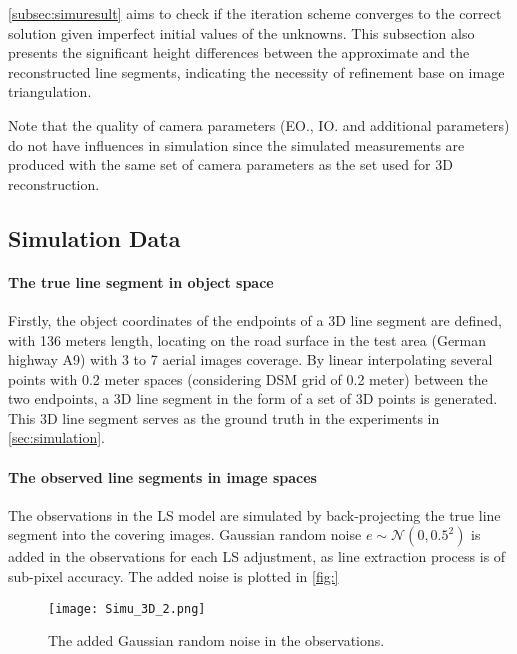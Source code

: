 \cref{subsec:simuresult} aims to check if the iteration scheme converges to the correct solution given imperfect initial values of the unknowns. This subsection also presents the significant height differences between the approximate and the reconstructed line segments, indicating the necessity of refinement base on image triangulation.

Note that the quality of camera parameters (EO., IO. and additional parameters) do not have influences in simulation since the simulated measurements are produced with the same set of camera parameters as the set used for 3D reconstruction.



\subsection{Simulation Data}
\label{subsec:simudata}

\paragraph{The true line segment in object space}
Firstly, the object coordinates of the endpoints of a 3D line segment are defined, with 136 meters length, locating on the road surface in the test area (German highway A9) with 3 to 7 aerial images coverage. By linear interpolating several points with 0.2 meter spaces (considering DSM grid of 0.2 meter) between the two endpoints, a 3D line segment in the form of a set of 3D points is generated. This 3D line segment serves as the ground truth in the experiments in \cref{sec:simulation}. 

\paragraph{The observed line segments in image spaces}
The observations in the LS model are simulated by back-projecting the true line segment into the covering images. Gaussian random noise $e\sim\mathcal{N}(0,0.5^2)$ is added in the observations for each LS adjustment, as line extraction process is of sub-pixel accuracy. The added noise is plotted in \cref{fig:}
\begin{figure}
  \centering
  \texttt{[image: Simu\_3D\_2.png]} %
  \caption{\small The added Gaussian random noise in the observations.}
  \label{fig:noise}
\end{figure}

